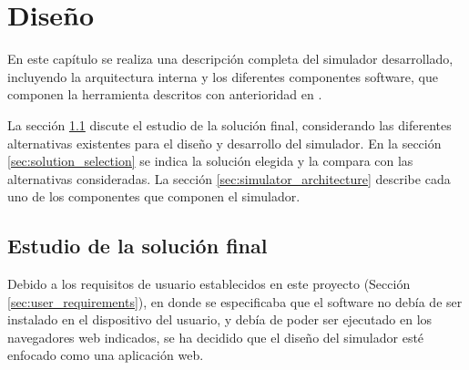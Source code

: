 \chead[]{}
\renewcommand{\headrulewidth}{0.5pt}

\lfoot[]{}
\cfoot[]{}
\rfoot[]{}
\renewcommand{\footrulewidth}{0pt}

\chapter{Diseño}
\label{ch:design}

En este capítulo se realiza una descripción completa del simulador desarrollado, incluyendo la arquitectura interna y los diferentes componentes software, que componen la herramienta descritos con anterioridad en \cite{mateos2016wepsim}.

La sección \ref{sec:study_of_solution} discute el estudio de la solución final, considerando las diferentes alternativas existentes para el diseño y desarrollo del simulador. En la sección \ref{sec:solution_selection} se indica la solución elegida y la compara con las alternativas consideradas. La sección \ref{sec:simulator_architecture} describe cada uno de los componentes que componen el simulador.

\section{Estudio de la solución final}
\label{sec:study_of_solution}

Debido a los requisitos de usuario establecidos en este proyecto (Sección \ref{sec:user_requirements}), en donde se especificaba que el software no debía de ser instalado en el dispositivo del usuario, y debía de poder ser ejecutado en los navegadores web indicados, se ha decidido que el diseño del simulador esté enfocado como una aplicación web.


